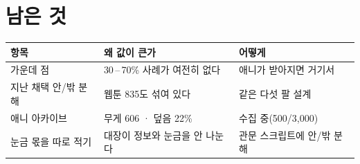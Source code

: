 \documentclass[11pt]{article}
\begin{document}
\section{남은 것}

\begin{center}
\begin{tabular}{lll}
\hline
항목 & 왜 값이 큰가 & 어떻게 \\
\hline
가운데 점 & 30\,--\,70\% 사례가 여전히 없다 & 애니가 받아지면 거기서 \\
지난 채택 안/밖 분해 & 웹툰 835도 섞여 있다 & 같은 다섯 팔 설계 \\
애니 아카이브 & 무게 606 · 덮음 22\% & 수집 중(500/3,000) \\
눈금 몫을 따로 적기 & 대장이 정보와 눈금을 안 나눈다 & 관문 스크립트에 안/밖 분해 \\
\hline
\end{tabular}
\end{center}
\end{document}
